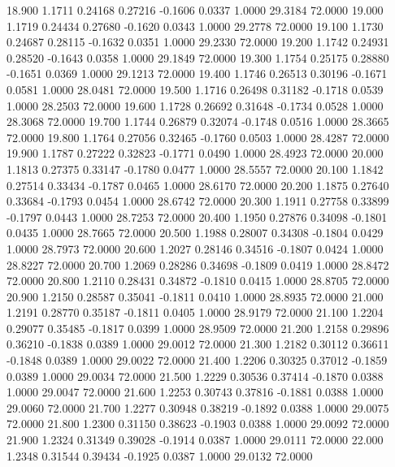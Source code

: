   18.900   1.1711   0.24168   0.27216  -0.1606   0.0337   1.0000  29.3184  72.0000
  19.000   1.1719   0.24434   0.27680  -0.1620   0.0343   1.0000  29.2778  72.0000
  19.100   1.1730   0.24687   0.28115  -0.1632   0.0351   1.0000  29.2330  72.0000
  19.200   1.1742   0.24931   0.28520  -0.1643   0.0358   1.0000  29.1849  72.0000
  19.300   1.1754   0.25175   0.28880  -0.1651   0.0369   1.0000  29.1213  72.0000
  19.400   1.1746   0.26513   0.30196  -0.1671   0.0581   1.0000  28.0481  72.0000
  19.500   1.1716   0.26498   0.31182  -0.1718   0.0539   1.0000  28.2503  72.0000
  19.600   1.1728   0.26692   0.31648  -0.1734   0.0528   1.0000  28.3068  72.0000
  19.700   1.1744   0.26879   0.32074  -0.1748   0.0516   1.0000  28.3665  72.0000
  19.800   1.1764   0.27056   0.32465  -0.1760   0.0503   1.0000  28.4287  72.0000
  19.900   1.1787   0.27222   0.32823  -0.1771   0.0490   1.0000  28.4923  72.0000
  20.000   1.1813   0.27375   0.33147  -0.1780   0.0477   1.0000  28.5557  72.0000
  20.100   1.1842   0.27514   0.33434  -0.1787   0.0465   1.0000  28.6170  72.0000
  20.200   1.1875   0.27640   0.33684  -0.1793   0.0454   1.0000  28.6742  72.0000
  20.300   1.1911   0.27758   0.33899  -0.1797   0.0443   1.0000  28.7253  72.0000
  20.400   1.1950   0.27876   0.34098  -0.1801   0.0435   1.0000  28.7665  72.0000
  20.500   1.1988   0.28007   0.34308  -0.1804   0.0429   1.0000  28.7973  72.0000
  20.600   1.2027   0.28146   0.34516  -0.1807   0.0424   1.0000  28.8227  72.0000
  20.700   1.2069   0.28286   0.34698  -0.1809   0.0419   1.0000  28.8472  72.0000
  20.800   1.2110   0.28431   0.34872  -0.1810   0.0415   1.0000  28.8705  72.0000
  20.900   1.2150   0.28587   0.35041  -0.1811   0.0410   1.0000  28.8935  72.0000
  21.000   1.2191   0.28770   0.35187  -0.1811   0.0405   1.0000  28.9179  72.0000
  21.100   1.2204   0.29077   0.35485  -0.1817   0.0399   1.0000  28.9509  72.0000
  21.200   1.2158   0.29896   0.36210  -0.1838   0.0389   1.0000  29.0012  72.0000
  21.300   1.2182   0.30112   0.36611  -0.1848   0.0389   1.0000  29.0022  72.0000
  21.400   1.2206   0.30325   0.37012  -0.1859   0.0389   1.0000  29.0034  72.0000
  21.500   1.2229   0.30536   0.37414  -0.1870   0.0388   1.0000  29.0047  72.0000
  21.600   1.2253   0.30743   0.37816  -0.1881   0.0388   1.0000  29.0060  72.0000
  21.700   1.2277   0.30948   0.38219  -0.1892   0.0388   1.0000  29.0075  72.0000
  21.800   1.2300   0.31150   0.38623  -0.1903   0.0388   1.0000  29.0092  72.0000
  21.900   1.2324   0.31349   0.39028  -0.1914   0.0387   1.0000  29.0111  72.0000
  22.000   1.2348   0.31544   0.39434  -0.1925   0.0387   1.0000  29.0132  72.0000
